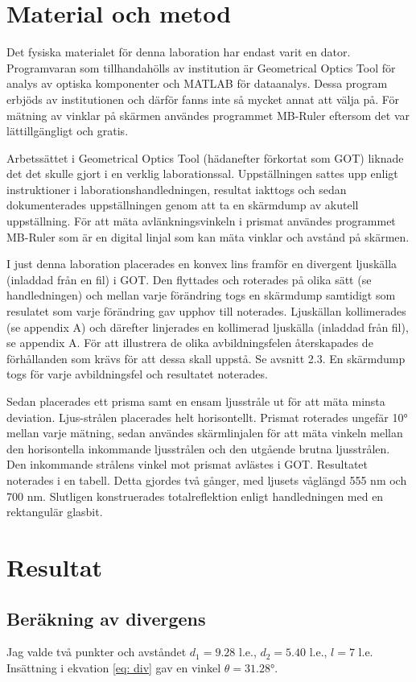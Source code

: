 \documentclass[a4paper]{article}
\begin{document}
\section{Material och metod}
Det fysiska materialet för denna laboration har endast varit en dator. Programvaran som tillhandahölls
av institution är Geometrical Optics Tool för analys av optiska komponenter och MATLAB för dataanalys. 
Dessa program erbjöds av institutionen och därför fanns inte så mycket annat att välja på. För mätning
av vinklar på skärmen användes programmet MB-Ruler eftersom det var lättillgängligt och gratis.

Arbetssättet i Geometrical Optics Tool (hädanefter förkortat som GOT) liknade det det skulle gjort
i en verklig laborationssal. Uppställningen sattes upp enligt instruktioner i laborationshandledningen, 
resultat iakttogs och sedan dokumenterades uppställningen genom att ta en skärmdump av akutell uppställning. För att mäta avlänkningsvinkeln i prismat användes programmet MB-Ruler som är en digital linjal
som kan mäta vinklar och avstånd på skärmen.

I just denna laboration placerades en konvex lins framför en divergent ljuskälla (inladdad från en fil) i GOT. Den flyttades och roterades på olika sätt (se handledningen)
och mellan varje förändring togs en skärmdump samtidigt som resulatet som varje förändring gav upphov till noterades. Ljuskällan kollimerades (se appendix A)
och därefter linjerades en kollimerad ljuskälla (inladdad från fil), se appendix A. För att illustrera de olika avbildningsfelen återskapades
de förhållanden som krävs för att dessa skall uppstå. Se avsnitt 2.3. En skärmdump togs för varje avbildningsfel och resultatet noterades.

Sedan placerades ett prisma samt en ensam ljusstråle ut för att mäta minsta deviation. Ljus-strålen placerades helt horisontellt. Prismat roterades ungefär
\ang{10} mellan varje mätning, sedan användes skärmlinjalen för att mäta vinkeln mellan den horisontella inkommande ljusstrålen och den utgående
brutna ljusstrålen. Den inkommande strålens vinkel mot prismat avlästes i GOT. Resultatet noterades i en tabell. Detta gjordes två gånger, med ljusets våglängd 555 nm och 700 nm.
Slutligen konstruerades totalreflektion enligt handledningen med en rektangulär glasbit.
\section{Resultat}
\subsection{Beräkning av divergens} \label{div}
Jag valde två punkter och avståndet $d_1 = 9.28$ l.e., $d_2 = 5.40$ l.e., $l = 7$ l.e.
Insättning i ekvation \ref{eq: div} gav en vinkel $\theta = \ang{31.28}$.
\end{document}
